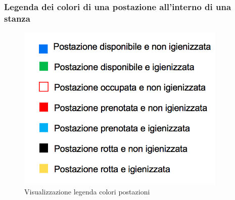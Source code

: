 \subsubsection{Legenda dei colori di una postazione all'interno di una stanza}
\begin{figure}[H]
	\centering
	\includegraphics[width=10cm]{res/images/legendaColori.png}
	\caption{Visualizzazione legenda colori postazioni}
\end{figure}

